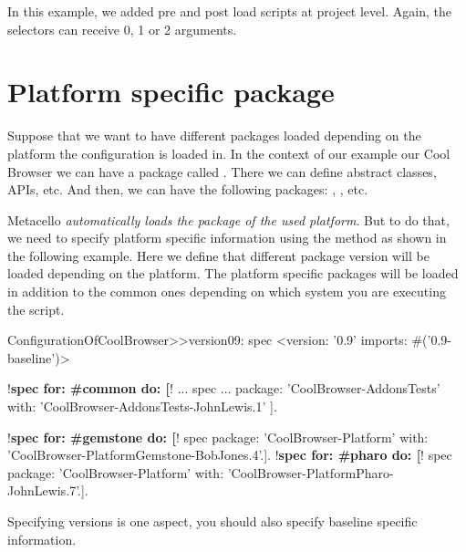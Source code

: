 \documentclass[a4paper,10pt,twoside]{book}
\begin{document}
In this example, we added pre and post load scripts at project level. Again, the selectors can receive 0, 1 or 2 arguments. 


\section {Platform specific package}

Suppose that we want to have different packages loaded depending on the platform the configuration is loaded in. In the context of our example our Cool Browser we can have a package called . There we can define abstract classes, APIs, etc. And then, we can have the following packages: , , etc.

Metacello \emph{automatically loads the package of the used platform}. But to do that, we need to specify platform specific information using the method  as shown in the following example. Here we define that different package version will be loaded depending on the platform. The platform specific packages will be loaded in addition to the common ones depending on which system you are executing the script. 

\begin{code}{} 
ConfigurationOfCoolBrowser>>version09: spec 
       <version: '0.9' imports: #('0.9-baseline')>
       
       !\textbf{spec for: \#common do: [}!
              ...
              spec 
                 ...
                     package: 'CoolBrowser-AddonsTests' with: 'CoolBrowser-AddonsTests-JohnLewis.1' ].
       
       !\textbf{spec for: \#gemstone do: [}!
              spec package: 'CoolBrowser-Platform' with: 'CoolBrowser-PlatformGemstone-BobJones.4'.].
       !\textbf{spec for: \#pharo do: [}!
              spec package: 'CoolBrowser-Platform' with: 'CoolBrowser-PlatformPharo-JohnLewis.7'.].
\end{code}

Specifying versions is one aspect, you should also specify baseline specific information. 
\end{document}
